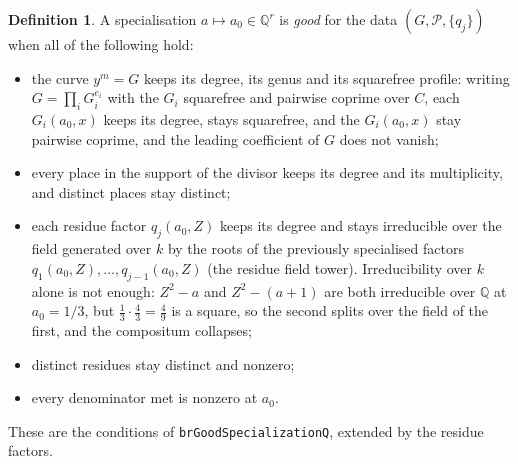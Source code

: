 \documentclass[11pt]{article}
\theoremstyle{definition}
\newtheorem{definition}[theorem]{Definition}
\theoremstyle{remark}
\newcommand{\Q}{\mathbb{Q}}
\newcommand{\code}[1]{\texttt{#1}}
\begin{document}
\begin{definition}
A specialisation $a\mapsto a_0\in\Q^r$ is \emph{good} for the data
$(G,\mathcal P,\{q_j\})$ when all of the following hold:
\begin{itemize}
\item the curve $y^m=G$ keeps its degree, its genus and its squarefree profile: writing
  $G=\prod_i G_i^{e_i}$ with the $G_i$ squarefree and pairwise coprime over $C$, each
  $G_i(a_0,x)$ keeps its degree, stays squarefree, and the $G_i(a_0,x)$ stay pairwise
  coprime, and the leading coefficient of $G$ does not vanish;
\item every place in the support of the divisor keeps its degree and its multiplicity,
  and distinct places stay distinct;
\item each residue factor $q_j(a_0,Z)$ keeps its degree and stays irreducible over the
  field generated over $k$ by the roots of the previously specialised factors
  $q_1(a_0,Z),\dots,q_{j-1}(a_0,Z)$ (the residue field tower). Irreducibility over $k$
  alone is not enough: $Z^2-a$ and $Z^2-(a+1)$ are both irreducible over $\Q$ at
  $a_0=1/3$, but $\tfrac13\cdot\tfrac43=\tfrac49$ is a square, so the second splits over
  the field of the first, and the compositum collapses;
\item distinct residues stay distinct and nonzero;
\item every denominator met is nonzero at $a_0$.
\end{itemize}
These are the conditions of \code{brGoodSpecializationQ}, extended by the residue
factors.
\end{definition}
\end{document}
